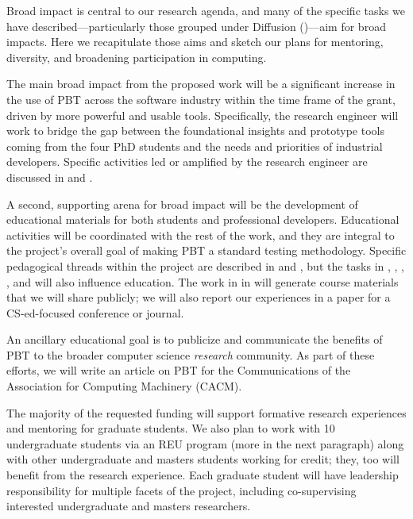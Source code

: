 


Broad impact is central to our research agenda, and many of the specific
tasks we have described---particularly those grouped under Diffusion
()---aim for broad impacts.  Here we
recapitulate those aims and sketch our plans for mentoring, diversity,
and broadening participation in computing.

\smallskip
{} The main broad impact from the
proposed work will be a significant increase in the use of PBT across
the software industry within the time frame of the grant, driven
by more powerful and usable tools. Specifically, the research engineer will work to
bridge the gap between the foundational insights and prototype tools
coming from the four PhD students and the needs and priorities of
industrial developers.
Specific activities led or amplified by the research engineer are discussed in
 and .

\smallskip
{}
%
A second, supporting arena for broad impact will be the
development of educational materials for both students and
professional developers. Educational activities will be
coordinated with the rest of the work, and they are integral to the
project's overall goal of making PBT a standard testing methodology.
Specific pedagogical
threads within the project are described in  and , but the
tasks in , ,
, , and
 will also influence education. The
work in  in will generate course materials that we will
share publicly; we will also report our experiences in a paper for a
CS-ed-focused conference or journal.

An ancillary educational goal is to
publicize and communicate the benefits of PBT to the broader computer science
{\em research} community. As part of these efforts, we will write an article on PBT
for the Communications of the Association for Computing Machinery
(CACM).

\smallskip
{}
%
The majority of the requested funding will support formative research
experiences and mentoring for graduate students. We
also plan to work with 10 undergraduate students via an
REU program (more in the next paragraph) along with other
undergraduate and masters
students working for credit;
they, too will benefit from the research experience. Each graduate
student will have leadership responsibility for multiple facets of the
project, including co-supervising interested undergraduate and masters
researchers.

